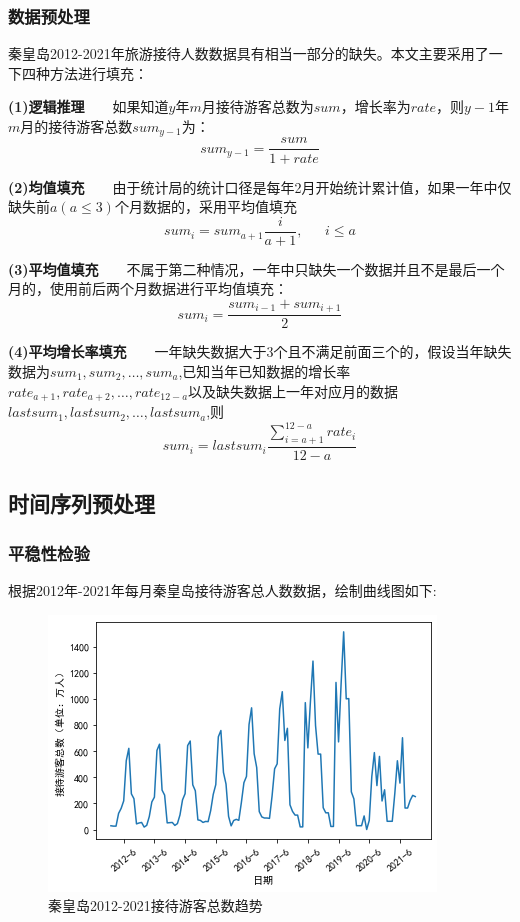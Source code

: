 		\subsubsection{数据预处理}
		秦皇岛2012-2021年旅游接待人数数据具有相当一部分的缺失。本文主要采用了一下四种方法进行填充：
		
		\textbf{(1)逻辑推理}~~~~如果知道$y$年$m$月接待游客总数为$sum$，增长率为$rate$，则$y-1$年$m$月的接待游客总数$sum_{y-1}$为：$$sum_{y-1}=\frac{sum}{1+rate}$$
		
		\textbf{(2)均值填充}~~~~由于统计局的统计口径是每年2月开始统计累计值，如果一年中仅缺失前$a(a\leq 3)$个月数据的，采用平均值填充
		$$sum_i=sum_{a+1}\frac{i}{a+1},~~~~~~~i \leq a$$
		
		\textbf{(3)平均值填充}~~~~不属于第二种情况，一年中只缺失一个数据并且不是最后一个月的，使用前后两个月数据进行平均值填充：$$sum_i=\frac{sum_{i-1}+sum_{i+1}}{2}$$
		
		\textbf{(4)平均增长率填充}~~~~一年缺失数据大于3个且不满足前面三个的，假设当年缺失数据为$sum_1,sum_2,\dots,sum_a$,已知当年已知数据的增长率$rate_{a+1},rate_{a+2},\dots,rate_{12-a}$以及缺失数据上一年对应月的数据$lastsum_1,lastsum_2,\dots,lastsum_a$,则$$sum_i=lastsum_i\frac{\sum_{i=a+1}^{12-a} rate_i}{12-a}$$
	\subsection{时间序列预处理}	
	\subsubsection{平稳性检验}
	根据2012年-2021年每月秦皇岛接待游客总人数数据，绘制曲线图如下:
		\begin{figure}[H]
			\centering
			\includegraphics[scale=0.5,angle=0]{images/6.png}
			\caption{秦皇岛2012-2021接待游客总数趋势}
			\label{6}
		\end{figure}
	
